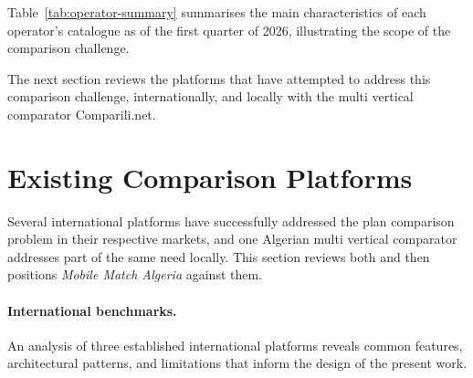 Table~\ref{tab:operator-summary} summarises the main characteristics of each operator's catalogue as of the first quarter of 2026, illustrating the scope of the comparison challenge.

\begin{table}[H]
  \caption{Summary of operator plan catalogues (Q1 2026)}
  \label{tab:operator-summary}
  \centering\small
\end{table}

The next section reviews the platforms that have attempted to address this comparison challenge, internationally, and locally with the multi vertical comparator Comparili.net.

\section{Existing Comparison Platforms}

Several international platforms have successfully addressed the plan comparison problem in their respective markets, and one Algerian multi vertical comparator addresses part of the same need locally. This section reviews both and then positions \textit{Mobile Match Algeria} against them.

\paragraph{International benchmarks.}
An analysis of three established international platforms reveals common features, architectural patterns, and limitations that inform the design of the present work.

